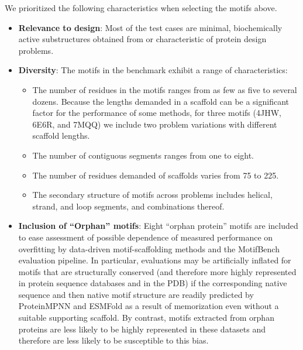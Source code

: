 We prioritized the following characteristics when selecting the motifs above.
\begin{itemize}
    \item{\textbf{Relevance to design}: Most of the test cases are minimal, biochemically active substructures obtained from or characteristic of protein design problems.}
    \item{\textbf{Diversity}: The motifs in the benchmark exhibit a range of characteristics:
    \begin{itemize}
        \item The number of residues in the motifs ranges from as few as five to several dozens.  Because the lengths demanded in a scaffold can be a significant factor for the performance of some methods, for three motifs (4JHW, 6E6R, and 7MQQ) we include two problem variations with different scaffold lengths.
        \item The number of contiguous segments ranges from one to eight.
        \item The number of residues demanded of scaffolds varies from 75 to 225. 
        \item The secondary structure of motifs across problems includes helical, strand, and loop segments, and combinations thereof.
        \end{itemize}}
\item{\textbf{Inclusion of ``Orphan'' motifs}:  Eight ``orphan protein'' motifs are included to ease assessment of possible dependence of measured performance on overfitting by data-driven motif-scaffolding methods and the MotifBench evaluation pipeline.  In particular, evaluations may be artificially inflated for motifs that are structurally conserved (and therefore more highly represented in protein sequence databases and in the PDB) if the corresponding native sequence and then native motif structure are readily predicted by ProteinMPNN and ESMFold as a result of memorization even without a suitable supporting scaffold.  By contrast, motifs extracted from orphan proteins are less likely to be highly represented in these datasets and therefore are less likely to be susceptible to this bias.} 
\end{itemize}

